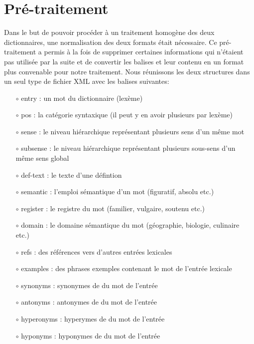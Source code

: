 \section{Pré-traitement}

Dans le but de pouvoir procéder à un traitement homogène des deux dictionnaires, 
une normalisation des deux formats était nécessaire. Ce pré-traitement a permis 
à la fois de supprimer certaines informations qui n'étaient pas utilisée par la 
suite et de convertir les balises et leur contenu en un format plus convenable 
pour notre traitement. Nous réunissons les deux structures dans un seul type de 
fichier XML avec les balises suivantes:

    \begin{itemize}
        \item[$\circ$] entry : un mot du dictionnaire (lexème)
        \item[$\circ$] pos : la catégorie syntaxique (il peut y en avoir 
plusieurs par lexème)
        \item[$\circ$] sense : le niveau hiérarchique représentant plusieurs 
        sens d'un même mot
        \item[$\circ$] subsense : le niveau hiérarchique représentant plusieurs 
        sous-sens d'un même sens global
        \item[$\circ$] def-text : le texte d'une défintion
        \item[$\circ$] semantic : l'emploi sémantique d'un mot (figuratif, 
        absolu etc.)
        \item[$\circ$] register : le registre du mot (familier, vulgaire, 
        soutenu etc.)
        \item[$\circ$] domain : le domaine sémantique du mot (géographie, 
        biologie, culinaire etc.)
        \item[$\circ$] refs : des références vers d'autres entrées lexicales
        \item[$\circ$] examples : des phrases exemples contenant le mot de 
        l'entrée lexicale
        \item[$\circ$] synonyms : synonymes de du mot de l'entrée
        \item[$\circ$] antonyms : antonymes de du mot de l'entrée
        \item[$\circ$] hyperonyms : hyperymes de du mot de l'entrée
        \item[$\circ$] hyponyms : hyponymes de du mot de l'entrée
    \end{itemize}
\bigskip

